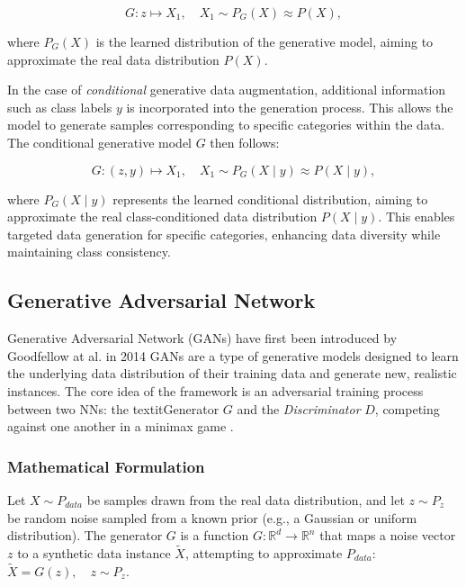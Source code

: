 \[
G: z \mapsto X_1, \quad X_1 \sim P_G(X) \approx P(X),
\]

\noindent
where \( P_G(X) \) is the learned distribution of the generative model, aiming to approximate the real data distribution \( P(X) \).

In the case of \textit{conditional} generative data augmentation, additional information such as class labels \( y \) is incorporated into the generation process. This allows the model to generate samples corresponding to specific categories within the data. The conditional generative model \( G \) then follows:

\[
G: (z, y) \mapsto X_1, \quad X_1 \sim P_G(X \mid y) \approx P(X \mid y),
\]

\noindent
where \( P_G(X \mid y) \) represents the learned conditional distribution, aiming to approximate the real class-conditioned data distribution \( P(X \mid y) \). This enables targeted data generation for specific categories, enhancing data diversity while maintaining class consistency.





\subsection[Generative Adversarial Network - GAN]{Generative Adversarial Network}\label{theoretical_gan}
Generative Adversarial Network (GANs) have first been introduced by Goodfellow at al. in 2014 \cite{goodfellow2014generativeadversarialnetworks} GANs are a type of generative models designed to learn the underlying data distribution of their training data and generate new, realistic instances. The core idea of the framework is an adversarial training process between two NNs: the textit{Generator} \(G\) and the \textit{Discriminator} \(D\), competing against one another in a minimax game \cite{VonNeumann1928Minimax}.

\subsubsection{Mathematical Formulation}\label{theoretical_gan_math}
Let \(X \sim P_{data}\) be samples drawn from the real data distribution, and let \(z \sim P_z\) be random noise sampled from a known prior (e.g., a Gaussian or uniform distribution). The generator \(G\) is a function \(G: \mathbb{R}^d \to \mathbb{R}^n\) that maps a noise vector \(z\) to a synthetic data instance \(\tilde{X}\), attempting to approximate \(P_{data}\):\(\tilde{X} = G(z), \quad z \sim P_z.\)

